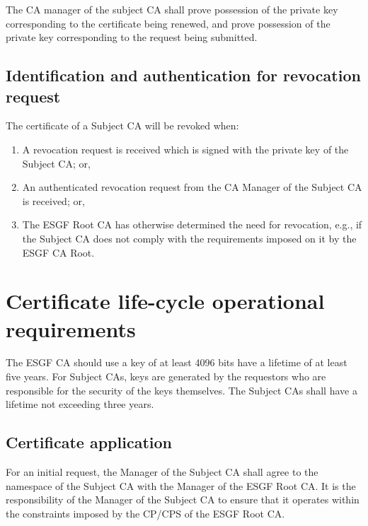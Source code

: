 The CA manager of the subject CA shall prove
possession of the private key corresponding to the certificate being
renewed, and prove possession of the private key corresponding to the
request being submitted.

\subsection{Identification and authentication for revocation request}\label{identification-and-authentication-for-revocation-request}

The certificate of a Subject CA will be revoked when:

\begin{enumerate}
\item
  
  A revocation request is received which is signed with the private key
  of the Subject CA; or,
  
\item
  
  An authenticated revocation request from the CA Manager of the Subject
  CA is received; or,
  
\item
  
  The ESGF Root CA has otherwise determined the need for revocation,
  e.g., if the Subject CA does not comply with the requirements imposed
  on it by the ESGF CA Root.
  
\end{enumerate}

\section{Certificate life-cycle operational requirements}\label{certificate-life-cycle-operational-requirements}

The ESGF CA should use a key of at least 4096 bits have a lifetime of at least five years. For Subject CAs, keys are generated by the requestors who are responsible for the security of the keys themselves. The Subject CAs shall have a lifetime not exceeding three years.

\subsection{Certificate application}\label{certificate-application}

For an initial request, the Manager of the Subject CA shall agree to the
namespace of the Subject CA with the Manager of the ESGF Root CA. It is
the responsibility of the Manager of the Subject CA to ensure that it
operates within the constraints imposed by the CP/CPS of the ESGF Root CA.

